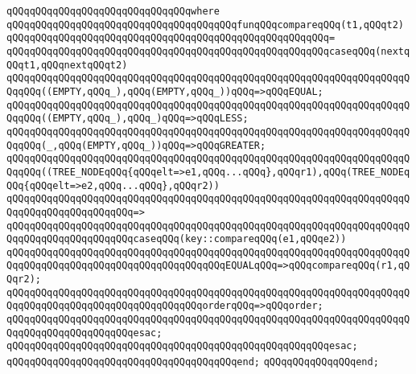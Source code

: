 \verb|qQQqqQQqqQQqqQQqqQQqqQQqqQQqqQQqwhere|\newline
\newline
\verb|qQQqqQQqqQQqqQQqqQQqqQQqqQQqqQQqqQQqqQQqfunqQQqcompareqQQq(t1,qQQqt2)|\newline
\verb|qQQqqQQqqQQqqQQqqQQqqQQqqQQqqQQqqQQqqQQqqQQqqQQqqQQqqQQq=|\newline
\verb|qQQqqQQqqQQqqQQqqQQqqQQqqQQqqQQqqQQqqQQqqQQqqQQqqQQqqQQqcaseqQQq(nextqQQqt1,qQQqnextqQQqt2)|\newline
\newline
\verb|qQQqqQQqqQQqqQQqqQQqqQQqqQQqqQQqqQQqqQQqqQQqqQQqqQQqqQQqqQQqqQQqqQQqqQQqqQQq((EMPTY,qQQq_),qQQq(EMPTY,qQQq_))qQQq=>qQQqEQUAL;|\newline
\newline
\verb|qQQqqQQqqQQqqQQqqQQqqQQqqQQqqQQqqQQqqQQqqQQqqQQqqQQqqQQqqQQqqQQqqQQqqQQqqQQq((EMPTY,qQQq_),qQQq_)qQQq=>qQQqLESS;|\newline
\newline
\verb|qQQqqQQqqQQqqQQqqQQqqQQqqQQqqQQqqQQqqQQqqQQqqQQqqQQqqQQqqQQqqQQqqQQqqQQqqQQq(_,qQQq(EMPTY,qQQq_))qQQq=>qQQqGREATER;|\newline
\newline
\verb|qQQqqQQqqQQqqQQqqQQqqQQqqQQqqQQqqQQqqQQqqQQqqQQqqQQqqQQqqQQqqQQqqQQqqQQqqQQq((TREE_NODEqQQq{qQQqelt=>e1,qQQq...qQQq},qQQqr1),qQQq(TREE_NODEqQQq{qQQqelt=>e2,qQQq...qQQq},qQQqr2))|\newline
\verb|qQQqqQQqqQQqqQQqqQQqqQQqqQQqqQQqqQQqqQQqqQQqqQQqqQQqqQQqqQQqqQQqqQQqqQQqqQQqqQQqqQQqqQQqqQQq=>|\newline
\verb|qQQqqQQqqQQqqQQqqQQqqQQqqQQqqQQqqQQqqQQqqQQqqQQqqQQqqQQqqQQqqQQqqQQqqQQqqQQqqQQqqQQqqQQqqQQqcaseqQQq(key::compareqQQq(e1,qQQqe2))|\newline
\verb|qQQqqQQqqQQqqQQqqQQqqQQqqQQqqQQqqQQqqQQqqQQqqQQqqQQqqQQqqQQqqQQqqQQqqQQqqQQqqQQqqQQqqQQqqQQqqQQqqQQqqQQqqQQqEQUALqQQq=>qQQqcompareqQQq(r1,qQQqr2);|\newline
\verb|qQQqqQQqqQQqqQQqqQQqqQQqqQQqqQQqqQQqqQQqqQQqqQQqqQQqqQQqqQQqqQQqqQQqqQQqqQQqqQQqqQQqqQQqqQQqqQQqqQQqqQQqorderqQQq=>qQQqorder;|\newline
\verb|qQQqqQQqqQQqqQQqqQQqqQQqqQQqqQQqqQQqqQQqqQQqqQQqqQQqqQQqqQQqqQQqqQQqqQQqqQQqqQQqqQQqqQQqqQQqesac;|\newline
\verb|qQQqqQQqqQQqqQQqqQQqqQQqqQQqqQQqqQQqqQQqqQQqqQQqqQQqqQQqesac;|\newline
\verb|qQQqqQQqqQQqqQQqqQQqqQQqqQQqqQQqqQQqqQQqend;|\newline
\verb|qQQqqQQqqQQqqQQqend;|\newline
